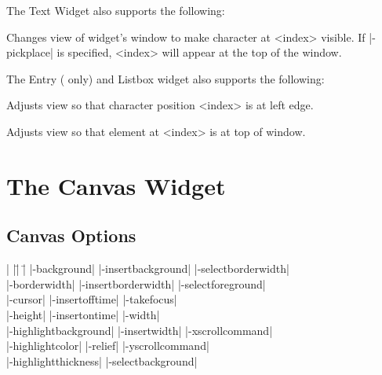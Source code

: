 \vskip5pt
The Text Widget also supports the following:

\begin{enum}{1cm}

Changes view of widget's window to make character at <index> visible. 
If |-pickplace| is specified, <index> will appear at the top of the window.

\end{enum}

\vskip5pt
The Entry ( only) and Listbox widget also supports the following:

\begin{enum}{1cm}

Adjusts view so that character position <index> is at left edge.

Adjusts view so that element at <index> is at top of window.

\end{enum}


\section{The Canvas Widget}

\subsection*{Canvas Options}
\begin{tabbing}
|                      |\=|                   |\= \kill
|-background|          \> |-insertbackground|   \> |-selectborderwidth|  \\
|-borderwidth|         \> |-insertborderwidth|  \> |-selectforeground| \\
|-cursor|    	       \> |-insertofftime|      \> |-takefocus|  \\
|-height|	       \> |-insertontime|       \> |-width| \\
|-highlightbackground| \> |-insertwidth|        \> |-xscrollcommand|    \\
|-highlightcolor|      \> |-relief|             \> |-yscrollcommand| \\
|-highlightthickness|  \> |-selectbackground|  \\
\end{tabbing}

